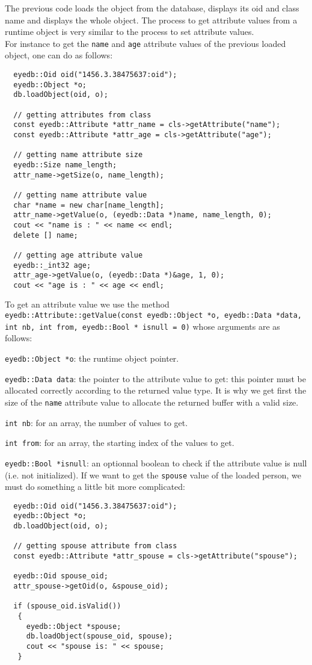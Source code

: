 \normalsize
The previous code loads the object from the database, displays its
oid and class name and displays the whole object.
The process to get attribute values from a runtime object is very similar
to the process to set attribute values.
\\
For instance to get the \texttt{name} and \texttt{age} attribute values of
the previous loaded object, one can do as follows:
\verbsize
\begin{verbatim}
  eyedb::Oid oid("1456.3.38475637:oid");
  eyedb::Object *o;
  db.loadObject(oid, o);

  // getting attributes from class
  const eyedb::Attribute *attr_name = cls->getAttribute("name");
  const eyedb::Attribute *attr_age = cls->getAttribute("age");

  // getting name attribute size
  eyedb::Size name_length;
  attr_name->getSize(o, name_length);

  // getting name attribute value
  char *name = new char[name_length];
  attr_name->getValue(o, (eyedb::Data *)name, name_length, 0);
  cout << "name is : " << name << endl;
  delete [] name;

  // getting age attribute value
  eyedb::_int32 age;
  attr_age->getValue(o, (eyedb::Data *)&age, 1, 0);
  cout << "age is : " << age << endl;
\end{verbatim}
\normalsize
To get an attribute value we use the method
\texttt{eyedb::Attribute::getValue(const eyedb::Object *o, eyedb::Data *data,
int nb, int from, eyedb::Bool * isnull = 0)} whose arguments are as follows:
\be
\item \texttt{eyedb::Object *o}: the runtime object pointer.
\item \texttt{eyedb::Data data}: the pointer to the attribute value to get: this
pointer must be allocated correctly according to the returned value type.
It is why we get first the size of the \texttt{name} attribute value to allocate
the returned buffer with a valid size.
\item \texttt{int nb}: for an array, the number of values to get.
\item \texttt{int from}: for an array, the starting index of the values to get.
\item \texttt{eyedb::Bool *isnull}: an optionnal boolean to check if the attribute
value is null (i.e. not initialized).
\ee
If we want to get the \texttt{spouse} value of the loaded person,
we must do something a little bit more complicated:
\verbsize
\begin{verbatim}
  eyedb::Oid oid("1456.3.38475637:oid");
  eyedb::Object *o;
  db.loadObject(oid, o);

  // getting spouse attribute from class
  const eyedb::Attribute *attr_spouse = cls->getAttribute("spouse");

  eyedb::Oid spouse_oid;
  attr_spouse->getOid(o, &spouse_oid);

  if (spouse_oid.isValid())
   {
     eyedb::Object *spouse;
     db.loadObject(spouse_oid, spouse);
     cout << "spouse is: " << spouse;
   }
\end{verbatim}
